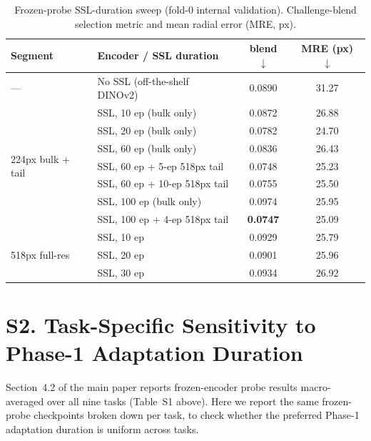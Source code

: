 \documentclass[runningheads]{llncs}
\begin{document}
\begin{table}[h]
\caption{Frozen-probe SSL-duration sweep (fold-0 internal validation).
Challenge-blend selection metric and mean radial error (MRE, px).}
\label{tab:supp-ssl-sweep}
\centering
\begin{tabular}{@{}llcc@{}}
\toprule
Segment & Encoder / SSL duration & blend $\downarrow$ & MRE (px) $\downarrow$ \\
\midrule
--- & No SSL (off-the-shelf DINOv2) & 0.0890 & 31.27 \\
\multirow{7}{*}{224px bulk + tail}
 & SSL, 10 ep (bulk only) & 0.0872 & 26.88 \\
 & SSL, 20 ep (bulk only) & 0.0782 & 24.70 \\
 & SSL, 60 ep (bulk only) & 0.0836 & 26.43 \\
 & SSL, 60 ep + 5-ep 518px tail & 0.0748 & 25.23 \\
 & SSL, 60 ep + 10-ep 518px tail & 0.0755 & 25.50 \\
 & SSL, 100 ep (bulk only) & 0.0974 & 25.95 \\
 & SSL, 100 ep + 4-ep 518px tail & \textbf{0.0747} & 25.09 \\
\multirow{3}{*}{518px full-res}
 & SSL, 10 ep & 0.0929 & 25.79 \\
 & SSL, 20 ep & 0.0901 & 25.96 \\
 & SSL, 30 ep & 0.0934 & 26.92 \\
\bottomrule
\end{tabular}
\end{table}

\section*{S2. Task-Specific Sensitivity to Phase-1 Adaptation Duration}

Section~4.2 of the main paper reports frozen-encoder probe results
macro-averaged over all nine tasks (Table~S1 above). Here we report the same
frozen-probe checkpoints broken down per task, to check whether the
preferred Phase-1 adaptation duration is uniform across tasks.
\end{document}
